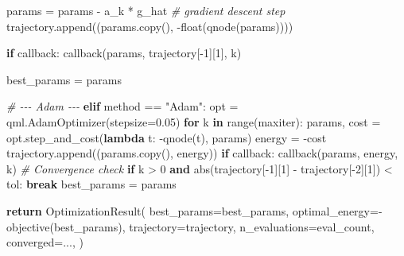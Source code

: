 \documentclass[
  11pt,
]{report}
\newenvironment{Shaded}{}{}
\newcommand{\BuiltInTok}[1]{\textcolor[rgb]{0.00,0.50,0.00}{#1}}
\newcommand{\CommentTok}[1]{\textcolor[rgb]{0.38,0.63,0.69}{\textit{#1}}}
\newcommand{\ControlFlowTok}[1]{\textcolor[rgb]{0.00,0.44,0.13}{\textbf{#1}}}
\newcommand{\DecValTok}[1]{\textcolor[rgb]{0.25,0.63,0.44}{#1}}
\newcommand{\FloatTok}[1]{\textcolor[rgb]{0.25,0.63,0.44}{#1}}
\newcommand{\KeywordTok}[1]{\textcolor[rgb]{0.00,0.44,0.13}{\textbf{#1}}}
\newcommand{\NormalTok}[1]{#1}
\newcommand{\OperatorTok}[1]{\textcolor[rgb]{0.40,0.40,0.40}{#1}}
\newcommand{\StringTok}[1]{\textcolor[rgb]{0.25,0.44,0.63}{#1}}
\begin{document}
\begin{Shaded}
\begin{Highlighting}[]
\NormalTok{            params }\OperatorTok{=}\NormalTok{ params }\OperatorTok{{-}}\NormalTok{ a\_k }\OperatorTok{*}\NormalTok{ g\_hat      }\CommentTok{\# gradient descent step}
\NormalTok{            trajectory.append((params.copy(), }\OperatorTok{{-}}\BuiltInTok{float}\NormalTok{(qnode(params))))}

            \ControlFlowTok{if}\NormalTok{ callback:}
\NormalTok{                callback(params, trajectory[}\OperatorTok{{-}}\DecValTok{1}\NormalTok{][}\DecValTok{1}\NormalTok{], k)}

\NormalTok{        best\_params }\OperatorTok{=}\NormalTok{ params}

    \CommentTok{\# {-}{-}{-} Adam {-}{-}{-}}
    \ControlFlowTok{elif}\NormalTok{ method }\OperatorTok{==} \StringTok{"Adam"}\NormalTok{:}
\NormalTok{        opt }\OperatorTok{=}\NormalTok{ qml.AdamOptimizer(stepsize}\OperatorTok{=}\FloatTok{0.05}\NormalTok{)}
        \ControlFlowTok{for}\NormalTok{ k }\KeywordTok{in} \BuiltInTok{range}\NormalTok{(maxiter):}
\NormalTok{            params, cost }\OperatorTok{=}\NormalTok{ opt.step\_and\_cost(}\KeywordTok{lambda}\NormalTok{ t: }\OperatorTok{{-}}\NormalTok{qnode(t), params)}
\NormalTok{            energy }\OperatorTok{=} \OperatorTok{{-}}\NormalTok{cost}
\NormalTok{            trajectory.append((params.copy(), energy))}
            \ControlFlowTok{if}\NormalTok{ callback:}
\NormalTok{                callback(params, energy, k)}
            \CommentTok{\# Convergence check}
            \ControlFlowTok{if}\NormalTok{ k }\OperatorTok{\textgreater{}} \DecValTok{0} \KeywordTok{and} \BuiltInTok{abs}\NormalTok{(trajectory[}\OperatorTok{{-}}\DecValTok{1}\NormalTok{][}\DecValTok{1}\NormalTok{] }\OperatorTok{{-}}\NormalTok{ trajectory[}\OperatorTok{{-}}\DecValTok{2}\NormalTok{][}\DecValTok{1}\NormalTok{]) }\OperatorTok{\textless{}}\NormalTok{ tol:}
                \ControlFlowTok{break}
\NormalTok{        best\_params }\OperatorTok{=}\NormalTok{ params}

    \ControlFlowTok{return}\NormalTok{ OptimizationResult(}
\NormalTok{        best\_params}\OperatorTok{=}\NormalTok{best\_params,}
\NormalTok{        optimal\_energy}\OperatorTok{={-}}\NormalTok{objective(best\_params),}
\NormalTok{        trajectory}\OperatorTok{=}\NormalTok{trajectory,}
\NormalTok{        n\_evaluations}\OperatorTok{=}\NormalTok{eval\_count,}
\NormalTok{        converged}\OperatorTok{=}\NormalTok{...,}
\NormalTok{    )}



\end{Highlighting}
\end{Shaded}
\end{document}
